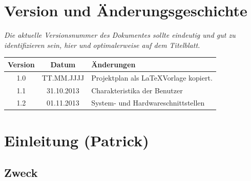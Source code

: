 \documentclass[fontsize=12pt,paper=a4,twoside]{scrartcl}
\begin{document}

\newpage

  \thispagestyle{fancy}
  \fancyhead{}
  \fancyfoot{}
  \renewcommand{\headrulewidth}{0.4pt}
  \tableofcontents
  \listoffigures %
  \listoftables %

\newpage



\section*{Version und Änderungsgeschichte}

{\em Die aktuelle Versionsnummer des Dokumentes sollte eindeutig und gut zu
identifizieren sein, hier und optimalerweise auf dem Titelblatt.}

\begin{tabular}{ccl}
Version & Datum & Änderungen \\
\hline
1.0 & TT.MM.JJJJ & Projektplan als \LaTeX Vorlage kopiert.\\
1.1 & 31.10.2013 & Charakteristika der Benutzer\\
1.2 & 01.11.2013 & System- und Hardwareschnittstellen \\
\end{tabular}


\section{Einleitung (Patrick)}


\subsection{Zweck}
\end{document}
